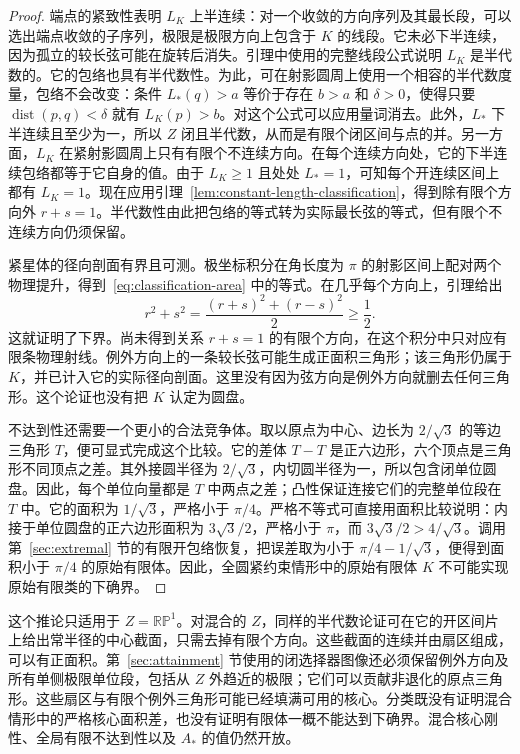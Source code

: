 \begin{proof}
端点的紧致性表明 $L_K$ 上半连续：对一个收敛的方向序列及其最长段，可以选出端点收敛的子序列，极限是极限方向上包含于 $K$ 的线段。它未必下半连续，因为孤立的较长弦可能在旋转后消失。引理中使用的完整线段公式说明 $L_K$ 是半代数的。它的包络也具有半代数性。为此，可在射影圆周上使用一个相容的半代数度量，包络不会改变：条件 $L_*(q)>a$ 等价于存在 $b>a$ 和 $\delta>0$，使得只要 $\operatorname{dist}(p,q)<\delta$ 就有 $L_K(p)>b$。对这个公式可以应用量词消去。此外，$L_*$ 下半连续且至少为一，所以 $Z$ 闭且半代数，从而是有限个闭区间与点的并。另一方面，$L_K$ 在紧射影圆周上只有有限个不连续方向。在每个连续方向处，它的下半连续包络都等于它自身的值。由于 $L_K\ge1$ 且处处 $L_*=1$，可知每个开连续区间上都有 $L_K=1$。现在应用引理~\ref{lem:constant-length-classification}，得到除有限个方向外 $r+s=1$。半代数性由此把包络的等式转为实际最长弦的等式，但有限个不连续方向仍须保留。

紧星体的径向剖面有界且可测。极坐标积分在角长度为 $\pi$ 的射影区间上配对两个物理提升，得到~\eqref{eq:classification-area} 中的等式。在几乎每个方向上，引理给出
\[
 r^2+s^2=\frac{(r+s)^2+(r-s)^2}{2}\ge\frac12.
\]
这就证明了下界。尚未得到关系 $r+s=1$ 的有限个方向，在这个积分中只对应有限条物理射线。例外方向上的一条较长弦可能生成正面积三角形；该三角形仍属于 $K$，并已计入它的实际径向剖面。这里没有因为弦方向是例外方向就删去任何三角形。这个论证也没有把 $K$ 认定为圆盘。

不达到性还需要一个更小的合法竞争体。取以原点为中心、边长为 $2/\sqrt3$ 的等边三角形 $T$，便可显式完成这个比较。它的差体 $T-T$ 是正六边形，六个顶点是三角形不同顶点之差。其外接圆半径为 $2/\sqrt3$，内切圆半径为一，所以包含闭单位圆盘。因此，每个单位向量都是 $T$ 中两点之差；凸性保证连接它们的完整单位段在 $T$ 中。它的面积为 $1/\sqrt3$，严格小于 $\pi/4$。严格不等式可直接用面积比较说明：内接于单位圆盘的正六边形面积为 $3\sqrt3/2$，严格小于 $\pi$，而 $3\sqrt3/2>4/\sqrt3$。调用第~\ref{sec:extremal} 节的有限开包络恢复，把误差取为小于 $\pi/4-1/\sqrt3$，便得到面积小于 $\pi/4$ 的原始有限体。因此，全圆紧约束情形中的原始有限体 $K$ 不可能实现原始有限类的下确界。
\end{proof}

这个推论只适用于 $Z=\mathbb {RP}^1$。对混合的 $Z$，同样的半代数论证可在它的开区间片上给出常半径的中心截面，只需去掉有限个方向。这些截面的连续并由扇区组成，可以有正面积。第~\ref{sec:attainment} 节使用的闭选择器图像还必须保留例外方向及所有单侧极限单位段，包括从 $Z$ 外趋近的极限；它们可以贡献非退化的原点三角形。这些扇区与有限个例外三角形可能已经填满可用的核心。分类既没有证明混合情形中的严格核心面积差，也没有证明有限体一概不能达到下确界。混合核心刚性、全局有限不达到性以及 $A_*$ 的值仍然开放。
